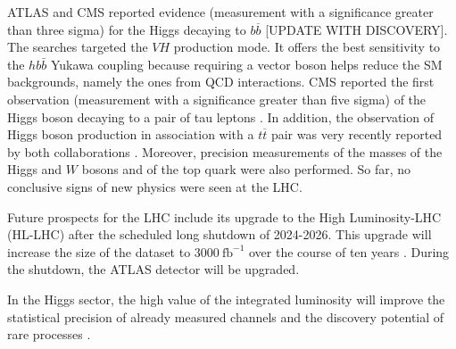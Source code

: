 ATLAS and CMS reported evidence (measurement with a significance greater than three sigma) for the Higgs decaying to $b\overline{b}$ \cite{h2bb, CMSh2bb} [UPDATE WITH DISCOVERY]. The searches targeted the $VH$ production mode. It offers the best sensitivity to the $hb\bar{b}$ Yukawa coupling because requiring a vector boson helps reduce the SM backgrounds, namely the ones from QCD interactions. CMS reported the first observation (measurement with a significance greater than five sigma) of the Higgs boson decaying to a pair of tau leptons \cite{CMSh2tautau}. In addition, the observation of Higgs boson production in association with a $t\overline{t}$ pair was very recently reported by both collaborations \cite{CMStth, ATLAStth}. Moreover, precision measurements of the masses of the Higgs \cite{ATLAShMass,hMass} and $W$ \cite{ATLASwMass} bosons and of the top quark \cite{ATLAStopMass, CMStopMass} were also performed. 
So far, no conclusive signs of new physics were seen at the LHC.

Future prospects for the LHC include its upgrade to the High Luminosity-LHC (HL-LHC) after
the scheduled long shutdown of 2024-2026. This upgrade will increase the size of the dataset to $3000~\text{fb}^{-1}$ over the course of ten years \cite{High-Luminosity}. 
During the shutdown, the ATLAS detector will be upgraded. 



In the Higgs sector, the high value of the integrated luminosity will improve the statistical precision of already measured channels and the discovery potential of rare processes \cite{HL_LHC}.

